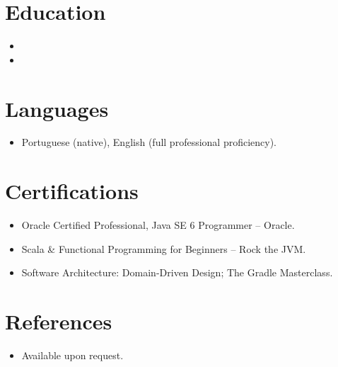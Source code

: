 \documentclass[11pt,a4paper,sans]{moderncv}
\begin{document}
\section{Education}
\vspace{1pt}
\begin{itemize}

\item{}

\vspace{3pt}

\item{}

\end{itemize}


\section{Languages}
\vspace{1pt}
\begin{itemize}
\item Portuguese (native), English (full professional proficiency).
\end{itemize}


\section{Certifications}
\vspace{1pt}
\begin{itemize}
\item{Oracle Certified Professional, Java SE 6 Programmer -- Oracle.}
\item{Scala \& Functional Programming for Beginners -- Rock the JVM.}
\item{Software Architecture: Domain-Driven Design; The Gradle Masterclass.}
\end{itemize}


\section{References}
\vspace{1pt}
\begin{itemize}
\item{Available upon request.}
\end{itemize}
\end{document}
